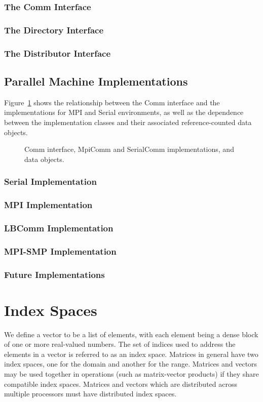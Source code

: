 \documentclass[12pt,relax]{PetraObjectModel}
\begin{document}
\subsubsection{The Comm Interface}
\subsubsection{The Directory Interface}
\subsubsection{The Distributor Interface}

\subsection{Parallel Machine Implementations}
Figure~\ref{commfigure} shows the relationship between the Comm interface and
the implementations for MPI and Serial environments, as well as the dependence
between the implementation classes and their associated reference-counted
data objects.
\begin{figure}[ht]
\begin{center}
\caption{Comm interface, MpiComm and SerialComm implementations, and data objects.}
\label{commfigure}
\end{center}
\end{figure}
\subsubsection{Serial Implementation}
\subsubsection{MPI Implementation}
\subsubsection{LBComm Implementation}
\subsubsection{MPI-SMP Implementation}
\subsubsection{Future Implementations}


\section{Index Spaces}
We define a vector to be a list of elements, with each element being a
dense block of one or more real-valued numbers. The set of indices used to
address the elements in a vector is referred to as an index space. Matrices
in general have two index spaces, one for the domain and another for the
range. Matrices and vectors may be used together in operations (such as
matrix-vector products) if they share compatible index spaces. Matrices
and vectors which are distributed across multiple processors must have
distributed index spaces.
\end{document}
